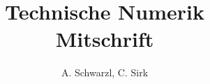 \documentclass[a4paper]{scrartcl}
\begin{document}
\title{Technische Numerik \\ Mitschrift}
\author{A. Schwarzl, C. Sirk}
\maketitle







%
%
%
%
\end{document}
